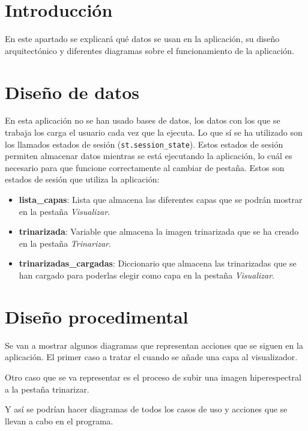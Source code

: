 
\section{Introducción}
En este apartado se explicará qué datos se usan en la aplicación, su diseño arquitectónico y diferentes diagramas sobre el funcionamiento de la aplicación.

\section{Diseño de datos}
En esta aplicación no se han usado bases de datos, los datos con los que se trabaja los carga el usuario cada vez que la ejecuta. Lo que sí se ha utilizado son los llamados estados de sesión (\verb|st.session_state|). Estos estados de sesión permiten almacenar datos mientras se está ejecutando la aplicación, lo cuál es necesario para que funcione correctamente al cambiar de pestaña. Estos son estados de sesión que utiliza la aplicación:
\begin{itemize}
    \item \textbf{lista\_capas}: Lista que almacena las diferentes capas que se podrán mostrar en la pestaña \textit{Visualizar}.
    \item \textbf{trinarizada}: Variable que almacena la imagen trinarizada que se ha creado en la pestaña \textit{Trinarizar}.
    \item \textbf{trinarizadas\_cargadas}: Diccionario que almacena las trinarizadas que se han cargado para poderlas elegir como capa en la pestaña \textit{Visualizar}.
\end{itemize}

\section{Diseño procedimental}
Se van a mostrar algunos diagramas que representan acciones que se siguen en la aplicación. El primer caso a tratar el cuando se añade una capa al visualizador.


Otro caso que se va representar es el proceso de subir una imagen hiperespectral a la pestaña trinarizar.


Y así se podrían hacer diagramas de todos los casos de uso y acciones que se llevan a cabo en el programa.

